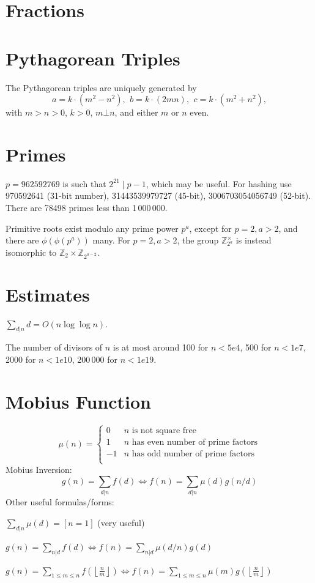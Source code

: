 \section{Fractions}

\section{Pythagorean Triples}
 The Pythagorean triples are uniquely generated by
 \[ a=k\cdot (m^{2}-n^{2}),\ \,b=k\cdot (2mn),\ \,c=k\cdot (m^{2}+n^{2}), \]
 with $m > n > 0$, $k > 0$, $m \bot n$, and either $m$ or $n$ even.

\section{Primes}
	$p=962592769$ is such that $2^{21} \mid p-1$, which may be useful. For hashing
	use 970592641 (31-bit number), 31443539979727 (45-bit), 3006703054056749
	(52-bit). There are 78498 primes less than 1\,000\,000.

	Primitive roots exist modulo any prime power $p^a$, except for $p = 2, a > 2$, and there are $\phi(\phi(p^a))$ many.
	For $p = 2, a > 2$, the group $\mathbb Z_{2^a}^\times$ is instead isomorphic to $\mathbb Z_2 \times \mathbb Z_{2^{a-2}}$.

\section{Estimates}
	$\sum_{d|n} d = O(n \log \log n)$.

	The number of divisors of $n$ is at most around 100 for $n < 5e4$, 500 for $n < 1e7$, 2000 for $n < 1e10$, 200\,000 for $n < 1e19$.

\section{Mobius Function}
\[
	\mu(n) = \begin{cases} 0 & n \textrm{ is not square free}\\ 1 & n \textrm{ has even number of prime factors}\\ -1 & n \textrm{ has odd number of prime factors}\\\end{cases}
\]
  Mobius Inversion:
  \[ g(n) = \sum_{d|n} f(d) \Leftrightarrow f(n) = \sum_{d|n} \mu(d)g(n/d) \]
  Other useful formulas/forms:

  $ \sum_{d | n} \mu(d) = [ n = 1] $ (very useful)

  $ g(n) = \sum_{n|d} f(d) \Leftrightarrow f(n) = \sum_{n|d} \mu(d/n)g(d)$

 $ g(n) = \sum_{1 \leq m \leq n} f(\left\lfloor\frac{n}{m}\right \rfloor ) \Leftrightarrow f(n) = \sum_{1\leq m\leq n} \mu(m)g(\left\lfloor\frac{n}{m}\right\rfloor)$
